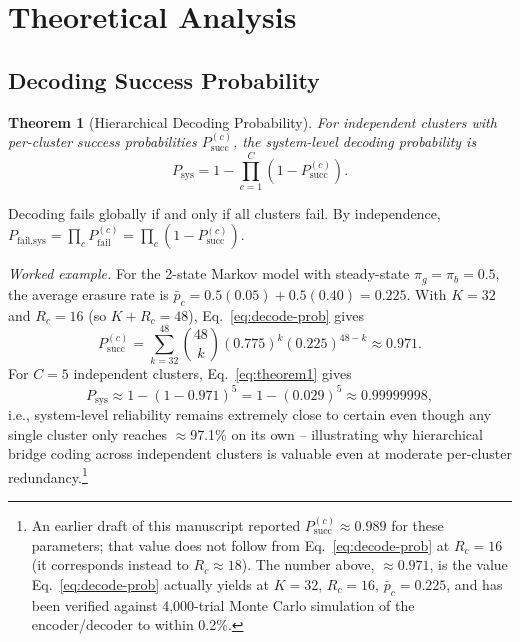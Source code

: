 \documentclass[journal]{IEEEtran}
\newtheorem{theorem}{Theorem}
\begin{document}
\section{Theoretical Analysis}
\label{sec:analysis}

\subsection{Decoding Success Probability}

\begin{theorem}[Hierarchical Decoding Probability]
\label{thm:decode}
For independent clusters with per-cluster success probabilities $P_{\text{succ}}^{(c)}$, the system-level decoding probability is
\begin{equation}
P_{\text{sys}} = 1 - \prod_{c=1}^{C} \left(1 - P_{\text{succ}}^{(c)}\right).
\label{eq:theorem1}
\end{equation}
\end{theorem}

\begin{IEEEproof}
Decoding fails globally if and only if all clusters fail. By independence,
$P_{\text{fail,sys}} = \prod_c P_{\text{fail}}^{(c)} = \prod_c \left(1 - P_{\text{succ}}^{(c)}\right)$.
\end{IEEEproof}

\emph{Worked example.} For the 2-state Markov model with steady-state $\pi_g = \pi_b = 0.5$, the average erasure rate is $\bar{p}_c = 0.5(0.05) + 0.5(0.40) = 0.225$. With $K = 32$ and $R_c = 16$ (so $K+R_c = 48$), Eq.~\eqref{eq:decode-prob} gives
\begin{equation}
P_{\text{succ}}^{(c)} = \sum_{k=32}^{48} \binom{48}{k} (0.775)^k (0.225)^{48-k} \approx 0.971.
\label{eq:theorem1-worked}
\end{equation}
For $C=5$ independent clusters, Eq.~\eqref{eq:theorem1} gives
\begin{equation}
P_{\text{sys}} \approx 1 - (1-0.971)^5 = 1 - (0.029)^5 \approx 0.99999998,
\end{equation}
i.e., system-level reliability remains extremely close to certain even though any single cluster only reaches $\approx$97.1\% on its own -- illustrating why hierarchical bridge coding across independent clusters is valuable even at moderate per-cluster redundancy.\footnote{An earlier draft of this manuscript reported $P_{\text{succ}}^{(c)} \approx 0.989$ for these parameters; that value does not follow from Eq.~\eqref{eq:decode-prob} at $R_c=16$ (it corresponds instead to $R_c \approx 18$). The number above, $\approx 0.971$, is the value Eq.~\eqref{eq:decode-prob} actually yields at $K=32,\,R_c=16,\,\bar p_c = 0.225$, and has been verified against 4{,}000-trial Monte Carlo simulation of the encoder/decoder to within 0.2\%.}
\end{document}
